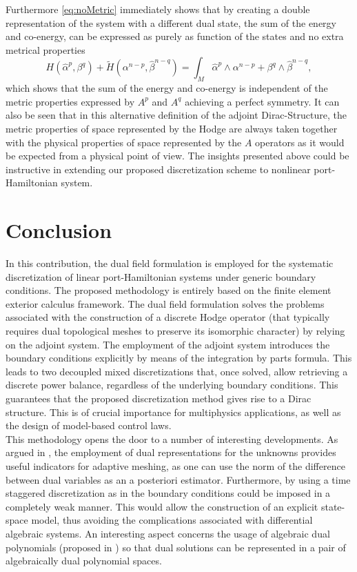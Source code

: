 \documentclass{elsarticle}
\newcommand*{\dual}[1]{\ensuremath{\widehat{#1}}}
\begin{document}
 Furthermore \eqref{eq:noMetric} immediately shows that by creating a double representation of the system with a different dual state,  the sum of the energy and co-energy, can be expressed as purely as function of the states and no extra metrical properties
\begin{equation}
   {H}(\dual{\alpha}^p, {\beta}^q)  +\widetilde{H}({\alpha}^{n-p}, \dual{\beta}^{n-q})
   = \int_M  \dual{\alpha}^p\wedge{\alpha}^{n-p}+{\beta}^q\wedge\dual{\beta}^{n-q},
\end{equation}
\noindent which shows that the sum of the energy and co-energy is independent of the metric properties expressed by $A^p$ and $A^q$ achieving a perfect symmetry. It can also be seen that in this alternative definition of the adjoint Dirac-Structure, the metric properties of space represented by the Hodge are always taken together with the physical properties of space represented by the $A$ operators as it would be expected from a physical point of view.
The insights presented above could be instructive in extending our proposed discretization scheme to nonlinear port-Hamiltonian system.

\section{Conclusion}

In this contribution, the dual field formulation is employed for the systematic discretization of linear port-Hamiltonian systems under generic boundary conditions. The proposed methodology is entirely based on the finite element exterior calculus framework. The dual field formulation solves the problems associated with the construction of a discrete Hodge operator (that typically requires dual topological meshes to preserve its isomorphic character) by relying on the adjoint system. The employment of the adjoint system introduces the boundary conditions explicitly by means of the integration by parts formula. This leads to two decoupled mixed discretizations that, once solved, allow retrieving a discrete power balance, regardless of the underlying boundary conditions. This guarantees that the proposed discretization method gives rise to a Dirac structure. This is of crucial importance for multiphysics applications, as well as the design of model-based control laws. \\


This methodology opens the door to a number of interesting developments. As argued in \cite{zhang2021mass}, the employment of dual representations for the unknowns provides useful indicators for adaptive meshing, as one can use the norm of the difference between dual variables as an a posteriori estimator. Furthermore, by using a time staggered discretization as in \cite{zhang2021mass} the boundary conditions could be imposed in a completely weak manner. This would allow the construction of an explicit state-space model, thus avoiding the complications associated with differential algebraic systems. An interesting aspect concerns the usage of algebraic dual polynomials (proposed in \cite{jain2021algdual}) so that dual solutions can be represented in a pair of algebraically dual polynomial spaces.\\
\end{document}
